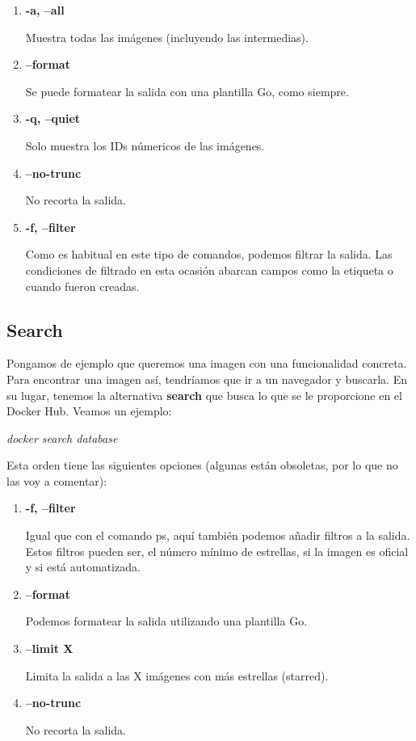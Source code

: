 \documentclass[]{article}
\begin{document}
\begin{enumerate}
\renewcommand{\labelenumi}{$ \bullet $}

\item {\bf -a, --all}

Muestra todas las imágenes (incluyendo las intermedias).

\item {\bf --format}

Se puede formatear la salida con una plantilla Go, como siempre.

\item {\bf -q, --quiet}

Solo muestra los IDs númericos de las imágenes.

\item {\bf --no-trunc}

No recorta la salida.

\item {\bf -f, --filter}

Como es habitual en este tipo de comandos, podemos filtrar la salida.
Las condiciones de filtrado en esta ocasión abarcan campos como la etiqueta o cuando fueron creadas.

\end{enumerate}


\subsection{Search}
Pongamos de ejemplo que queremos una imagen con una funcionalidad concreta. Para encontrar una imagen así, tendríamos que ir a un navegador y buscarla.
En su lugar, tenemos la alternativa \textbf{search} que busca lo que se le proporcione en el Docker Hub.
Veamos un ejemplo:

\begin{center}
\it
docker search database
\end{center}

Esta orden tiene las siguientes opciones (algunas están obsoletas, por lo que no las voy a comentar):

\begin{enumerate}
\renewcommand{\labelenumi}{$\bullet$}

\item {\bf -f, --filter}

Igual que con el comando ps, aquí también podemos añadir filtros a la salida.
Estos filtros pueden ser, el número mínimo de estrellas, si la imagen es oficial y si está automatizada.

\item {\bf --format}

Podemos formatear la salida utilizando una plantilla Go.

\item {\bf --limit X}

Limita la salida a las X imágenes con más estrellas (starred).

\item {\bf --no-trunc}

No recorta la salida.

\end{enumerate}
\end{document}
